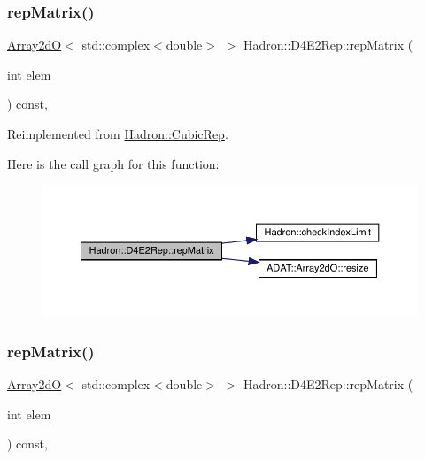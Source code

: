 \subsubsection{\texorpdfstring{repMatrix()}{repMatrix()}\hspace{0.1cm}{\footnotesize\ttfamily [1/3]}}
{\footnotesize\ttfamily \mbox{\hyperlink{classADAT_1_1Array2dO}{Array2dO}}$<$ std\+::complex$<$double$>$ $>$ Hadron\+::\+D4\+E2\+Rep\+::rep\+Matrix (\begin{DoxyParamCaption}\item[{int}]{elem }\end{DoxyParamCaption}) const\hspace{0.3cm}{\ttfamily [inline]}, {\ttfamily [virtual]}}



Reimplemented from \mbox{\hyperlink{structHadron_1_1CubicRep_ac5d7e9e6f4ab1158b5fce3e4ad9e8005}{Hadron\+::\+Cubic\+Rep}}.

Here is the call graph for this function\+:
\nopagebreak
\begin{figure}[H]
\begin{center}
\leavevmode
\includegraphics[width=350pt]{d5/da6/structHadron_1_1D4E2Rep_ae07926c0c41e03ed930683eb4e9be5f5_cgraph}
\end{center}
\end{figure}
\mbox{\label{structHadron_1_1D4E2Rep_ae07926c0c41e03ed930683eb4e9be5f5}} 
\subsubsection{\texorpdfstring{repMatrix()}{repMatrix()}\hspace{0.1cm}{\footnotesize\ttfamily [2/3]}}
{\footnotesize\ttfamily \mbox{\hyperlink{classADAT_1_1Array2dO}{Array2dO}}$<$ std\+::complex$<$double$>$ $>$ Hadron\+::\+D4\+E2\+Rep\+::rep\+Matrix (\begin{DoxyParamCaption}\item[{int}]{elem }\end{DoxyParamCaption}) const\hspace{0.3cm}{\ttfamily [inline]}, {\ttfamily [virtual]}}



